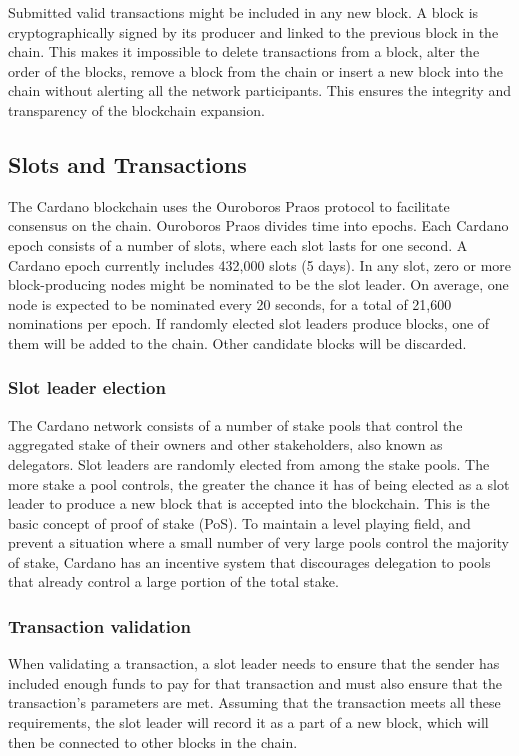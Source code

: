 \noindent
Submitted valid transactions might be included in any new block. 
A block is cryptographically signed by its producer and linked to the 
previous block in the chain. This makes it impossible to delete 
transactions from a block, alter the order of the blocks, remove a block 
from the chain or insert a new block into the chain without alerting all 
the network participants. This ensures the integrity and transparency of 
the blockchain expansion.

\vspace{0.2cm}

\subsection{Slots and Transactions}

The Cardano blockchain uses the Ouroboros Praos protocol to facilitate 
consensus on the chain. Ouroboros Praos divides time into epochs. Each 
Cardano epoch consists of a number of slots, where each slot lasts for 
one second. A Cardano epoch currently includes 432,000 slots (5 days). 
In any slot, zero or more block-producing nodes might be nominated to 
be the slot leader. On average, one node is expected to be nominated 
every 20 seconds, for a total of 21,600 nominations per epoch. If 
randomly elected slot leaders produce blocks, one of them will be added 
to the chain. Other candidate blocks will be discarded.

\vspace{0.5cm}

\subsubsection{Slot leader election}

The Cardano network consists of a number of stake pools that control 
the aggregated stake of their owners and other stakeholders, also known 
as delegators. Slot leaders are randomly elected from among the stake 
pools. The more stake a pool controls, the greater the chance it has 
of being elected as a slot leader to produce a new block that is accepted 
into the blockchain. This is the basic concept of proof of stake (PoS). 
To maintain a level playing field, and prevent a situation where a small 
number of very large pools control the majority of stake, Cardano has an 
incentive system that discourages delegation to pools that already control 
a large portion of the total stake.

\vspace{0.5cm}

\subsubsection{Transaction validation}

When validating a transaction, a slot leader needs to ensure that the 
sender has included enough funds to pay for that transaction and must 
also ensure that the transaction's parameters are met. Assuming that 
the transaction meets all these requirements, the slot leader will 
record it as a part of a new block, which will then be connected to 
other blocks in the chain.